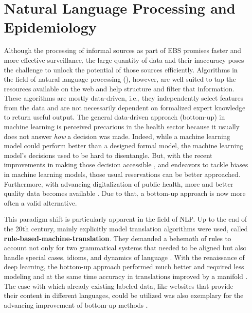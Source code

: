 \section{Natural Language Processing and Epidemiology}
  Although the processing of informal sources as part of EBS promises faster and more effective surveillance, the large quantity of data and their inaccuracy poses the challenge to unlock the potential of those sources efficiently.
  Algorithms in the field of natural language processing (), however, are well suited to tap the resources available on the web and help structure and filter that information.
  These algorithms are mostly data-driven, i.e., they independently select features from the data and are not necessarily dependent on formalized expert knowledge to return useful output.
  The general data-driven approach (bottom-up) in machine learning is perceived precarious in the health sector because it usually does not answer \emph{how} a decision was made.
  Indeed, while a machine learning model could perform better than a designed formal model, the machine learning model's decisions used to be hard to disentangle.
  But, with the recent improvements in making those decision accessible \citep{Arras2017}, and endeavors to tackle biases in machine learning models, those usual reservations can be better approached.
  Furthermore, with advancing digitalization of public health, more and better quality data becomes available \citep{DEMIS}.
  Due to that, a bottom-up approach is now more often a valid alternative.

  This paradigm shift is particularly apparent in the field of NLP.
  Up to the end of the 20th century, mainly explicitly model translation algorithms were used, called \textbf{rule-based-machine-translation}.
  They demanded a behemoth of rules to account not only for two grammatical systems that needed to be aligned but also handle special cases, idioms, and dynamics of language \citep{Bar-Hillel1953, Bar-Hillel1960}.
  With the renaissance of deep learning, the bottom-up approach performed much better and required less modeling and at the same time accuracy in translations improved by a manifold \citep{Bengio2003}.
  The ease with which already existing labeled data, like websites that provide their content in different languages, could be utilized was also exemplary for the advancing improvement of bottom-up methods \citep{Macklovitch00}.

